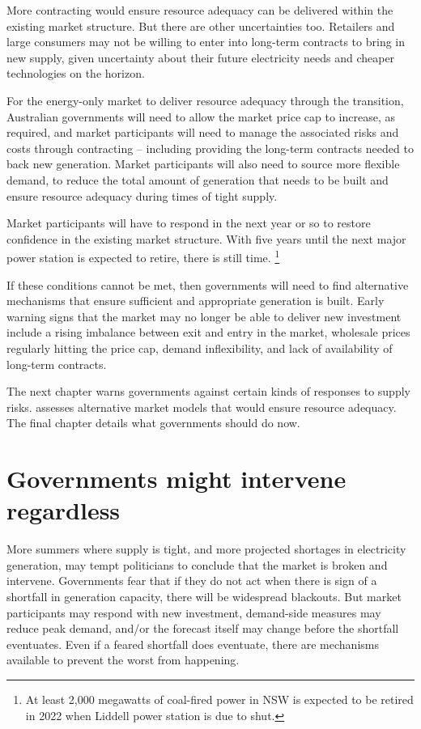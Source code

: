 \documentclass[FrontPage]{grattan}
\begin{document}
More contracting would ensure resource adequacy can be delivered within the existing market structure. But there are other uncertainties too. Retailers and large consumers may not be willing to enter into long-term contracts to bring in new supply, given uncertainty about their future electricity needs and cheaper technologies on the horizon.

For the energy-only market to deliver resource adequacy through the transition, Australian governments will need to allow the market price cap to increase, as required, and market participants will need to manage the associated risks and costs through contracting -- including providing the long-term contracts needed to back new generation. Market participants will also need to source more flexible demand, to reduce the total amount of generation that needs to be built and ensure resource adequacy during times of tight supply.

Market participants will have to respond in the next year or so to restore confidence in the existing market structure. With five years until the next major power station is expected to retire, there is still time.%
\footnote{At least 2,000 megawatts of coal-fired power in NSW is expected to be retired in 2022 when Liddell power station is due to shut.} 

If these conditions cannot be met, then governments will need to find alternative mechanisms that ensure sufficient and appropriate generation is built. Early warning signs that the market may no longer be able to deliver new investment include a rising imbalance between exit and entry in the market, wholesale prices regularly hitting the price cap, demand inflexibility, and lack of availability of long-term contracts.

The next chapter warns governments against certain kinds of responses to supply risks.  assesses alternative market models that would ensure resource adequacy. The final chapter details what governments should do now.


\chapter{Governments might intervene regardless}\label{chap:governments-may-intervene-regardless}
More summers where supply is tight, and more projected shortages in electricity generation, may tempt politicians to conclude that the market is broken and intervene. Governments fear that if they do not act when there is sign of a shortfall in generation capacity, there will be widespread blackouts. But market participants may respond with new investment, demand-side measures may reduce peak demand, and/or the forecast itself may change before the shortfall eventuates. Even if a feared shortfall does eventuate, there are mechanisms available to prevent the worst from happening.
\end{document}
